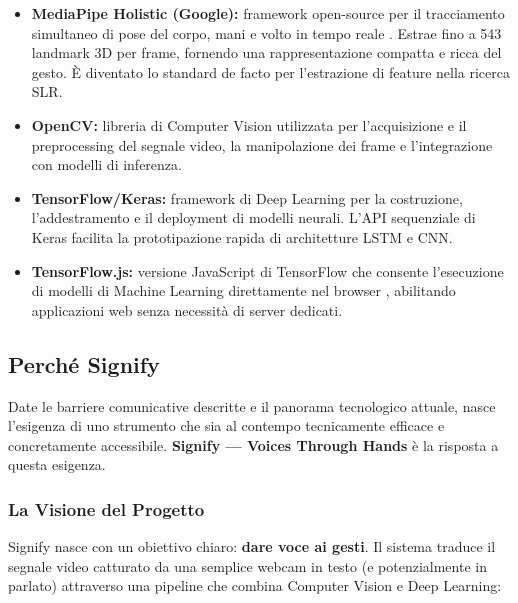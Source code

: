 \begin{itemize}
    \item \textbf{MediaPipe Holistic (Google):} framework open-source per il tracciamento simultaneo di pose del corpo, mani e volto in tempo reale \cite{mediapipe2020}. Estrae fino a 543 landmark 3D per frame, fornendo una rappresentazione compatta e ricca del gesto. È diventato lo standard de facto per l'estrazione di feature nella ricerca SLR.

    \item \textbf{OpenCV:} libreria di Computer Vision \cite{opencv2000} utilizzata per l'acquisizione e il preprocessing del segnale video, la manipolazione dei frame e l'integrazione con modelli di inferenza.

    \item \textbf{TensorFlow/Keras:} framework di Deep Learning \cite{tensorflow2015} per la costruzione, l'addestramento e il deployment di modelli neurali. L'API sequenziale di Keras facilita la prototipazione rapida di architetture LSTM e CNN.

    \item \textbf{TensorFlow.js:} versione JavaScript di TensorFlow che consente l'esecuzione di modelli di Machine Learning direttamente nel browser \cite{tensorflowjs2018}, abilitando applicazioni web senza necessità di server dedicati.
\end{itemize}


\subsection{Perché Signify}

Date le barriere comunicative descritte e il panorama tecnologico attuale, nasce l'esigenza di uno strumento che sia al contempo tecnicamente efficace e concretamente accessibile. \textbf{Signify --- Voices Through Hands} è la risposta a questa esigenza.

\subsubsection{La Visione del Progetto}

Signify nasce con un obiettivo chiaro: \textbf{dare voce ai gesti}. Il sistema traduce il segnale video catturato da una semplice webcam in testo (e potenzialmente in parlato) attraverso una pipeline che combina Computer Vision e Deep Learning:

